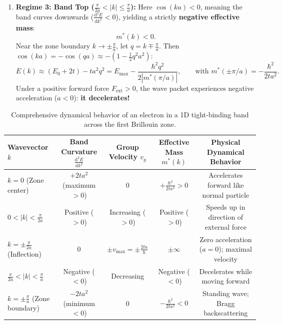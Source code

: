 \documentclass[11pt,a4paper]{article}
\newcommand{\abs}[1]{\left|#1\right|}
\newcommand{\dvtwo}[2]{\frac{\mathrm{d}^2#1}{\mathrm{d}#2^2}}
\newcommand{\hb}{\hbar}
\newcommand{\hbarsq}{\hb^2}
\begin{document}
\begin{enumerate}
    \item \textbf{Regime 3: Band Top ($\frac{\pi}{2a} < \abs{k} \le \frac{\pi}{a}$):}
    Here $\cos(ka) < 0$, meaning the band curves downwards ($\dvtwo{E}{k} < 0$), yielding a strictly \textbf{negative effective mass}:
    \begin{equation}
        m^*(k) < 0.
    \end{equation}
    Near the zone boundary $k \to \pm\frac{\pi}{a}$, let $q = k \mp \frac{\pi}{a}$. Then $\cos(ka) = -\cos(qa) \approx -(1 - \frac{1}{2}q^2a^2)$:
    \begin{equation}
        E(k) \approx (E_0 + 2t) - ta^2q^2 = E_{\max} - \frac{\hbarsq q^2}{2\abs{m^*(\pi/a)}}, \qquad \text{with } m^*(\pm\pi/a) = -\frac{\hbarsq}{2ta^2}.
    \end{equation}
    Under a positive forward force $F_{\mathrm{ext}} > 0$, the wave packet experiences negative acceleration ($a < 0$): \textbf{it decelerates!}
\end{enumerate}

\begin{table}[htbp]
\centering
\small
\renewcommand{\arraystretch}{1.25}
\begin{tabular}{lcccc}
\toprule
\textbf{Wavevector $k$} & \textbf{Band Curvature $\dvtwo{E}{k}$} & \textbf{Group Velocity $v_g$} & \textbf{Effective Mass $m^*(k)$} & \textbf{Physical Dynamical Behavior} \\
\midrule
$k = 0$ (Zone center) & $+2ta^2$ (maximum $>0$) & $0$ & $+\frac{\hbarsq}{2ta^2} > 0$ & Accelerates forward like normal particle \\
$0 < \abs{k} < \frac{\pi}{2a}$ & Positive ($>0$) & Increasing ($>0$) & Positive ($>0$) & Speeds up in direction of external force \\
$k = \pm\frac{\pi}{2a}$ (Inflection) & $0$ & $\pm v_{\max} = \pm \frac{2ta}{\hb}$ & $\pm\infty$ & Zero acceleration ($a=0$); maximal velocity \\
$\frac{\pi}{2a} < \abs{k} < \frac{\pi}{a}$ & Negative ($<0$) & Decreasing & Negative ($<0$) & Decelerates while moving forward \\
$k = \pm\frac{\pi}{a}$ (Zone boundary) & $-2ta^2$ (minimum $<0$) & $0$ & $-\frac{\hbarsq}{2ta^2} < 0$ & Standing wave; Bragg backscattering \\
\bottomrule
\end{tabular}
\caption{Comprehensive dynamical behavior of an electron in a 1D tight-binding band across the first Brillouin zone.}
\label{tab:1d_regimes_summary}
\end{table}
\end{document}
